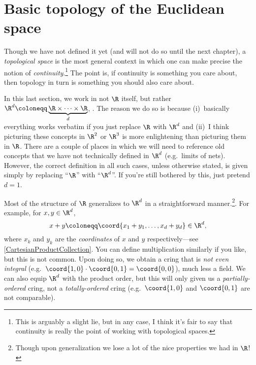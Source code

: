 \section{Basic topology of the Euclidean space}

Though we have not defined it yet (and will not do so until the next chapter), a \emph{topological space} is the most general context in which one can make precise the notion of \emph{continuity}.\footnote{This is arguably a slight lie, but in any case, I think it's fair to say that continuity is really the point of working with topological spaces.}  The point is, if continuity is something you care about, then topology in turn is something you should also care about.

In this last section, we work in not $\R$ itself, but rather $\R ^d\coloneqq \underbrace{\R \times \cdots \times \R}_d$, .  The reason we do so is because (i)~basically everything works verbatim if you just replace $\R$ with $\R ^d$ and (ii)~I think picturing these concepts in $\R ^2$ or $\R ^3$ is more enlightening than picturing them in $\R$.  There are a couple of places in which we will need to reference old concepts that we have not technically defined in $\R ^d$ (e.g.~limits of nets).  However, the correct definition in all such cases, unless otherwise stated, is given simply by replacing ``$\R$'' with ``$\R ^d$''.  If you're still bothered by this, just pretend $d=1$.

Most of the structure of $\R$ generalizes to $\R ^d$ in a straightforward manner.\footnote{Though upon generalization we lose a lot of the nice properties we had in $\R$!}.  For example, for $x,y\in \R ^d$,
\begin{equation}
x+y\coloneqq \coord{x_1+y_1,\ldots ,x_d+y_d}\in \R ^d,
\end{equation}
where $x_k$ and $y_k$ are the \emph{coordinates} of $x$ and $y$ respectively---see \cref{CartesianProductCollection}.  You can define multiplication similarly if you like, but this is not common.  Upon doing so, we obtain a cring that is \emph{not even integral} (e.g.~$\coord{1,0}\cdot \coord{0,1}=\coord{0,0}$), much less a field.  We can also equip $\R ^d$ with the product order, but this will only given us a \emph{partially-ordered} cring, not a \emph{totally-ordered} cring (e.g.~$\coord{1,0}$ and $\coord{0,1}$ are not comparable).

